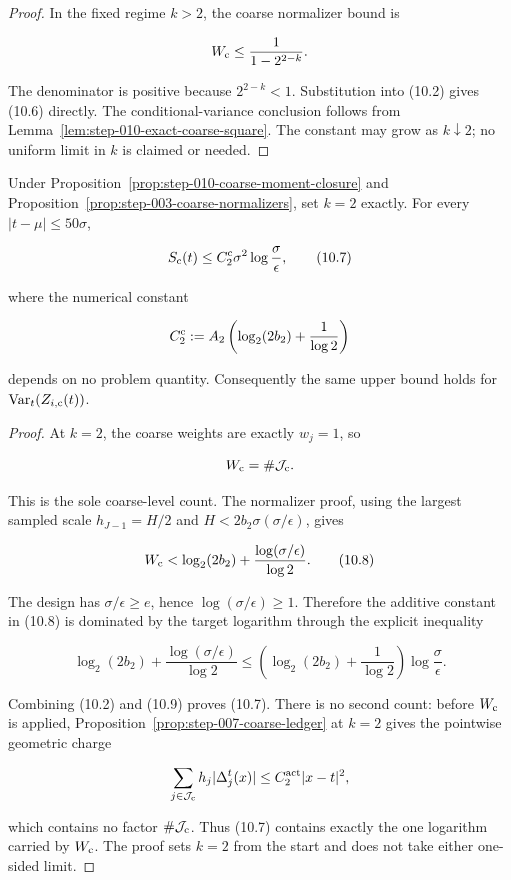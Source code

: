 \begin{proof}
In the fixed regime \(k>2\), the coarse
normalizer bound is

\[
W_{\rm c}\leq\frac1{1-2^{2-k}}.
\]

The denominator is positive because \(2^{2-k}<1\). Substitution into (10.2)
gives (10.6) directly. The conditional-variance conclusion follows from
Lemma~\ref{lem:step-010-exact-coarse-square}. The constant may grow as
\(k\downarrow2\); no uniform limit in \(k\) is claimed or needed.
\end{proof}

\begin{lemma}\label{lem:step-010-critical}
Under Proposition~\ref{prop:step-010-coarse-moment-closure} and Proposition~\ref{prop:step-003-coarse-normalizers}, set \(k=2\) exactly.
For every \(|t-\mu|\leq50\sigma\),

\[
S_{\rm c}(t)
\leq C_2^{\rm c}\sigma^2\log\frac{\sigma}{\epsilon},
\tag{10.7}
\]

where the numerical constant

\[
C_2^{\rm c}
:=A_2\left(\log_2(2b_2)+\frac1{\log2}\right)
\]

depends on no problem quantity. Consequently the same upper bound holds for
\(\operatorname{Var}_t(Z_{i,{\rm c}}(t))\).
\end{lemma}

\begin{proof}
At \(k=2\), the coarse weights are exactly
\(w_j=1\), so

\[
W_{\rm c}=\#\mathcal J_{\rm c}.
\]

This is the sole coarse-level count. The normalizer proof, using the
largest sampled scale \(h_{J-1}=H/2\) and
\(H<2b_2\sigma(\sigma/\epsilon)\), gives

\[
W_{\rm c}
<\log_2(2b_2)+\frac{\log(\sigma/\epsilon)}{\log2}.
\tag{10.8}
\]

The design has \(\sigma/\epsilon\geq e\), hence
\(\log(\sigma/\epsilon)\geq1\). Therefore the additive constant in (10.8)
is dominated by the target logarithm through the explicit inequality

\[
\log_2(2b_2)+\frac{\log(\sigma/\epsilon)}{\log2}
\leq
\left(\log_2(2b_2)+\frac1{\log2}\right)
\log\frac{\sigma}{\epsilon}.
\tag{10.9}
\]

Combining (10.2) and (10.9) proves (10.7). There is no second count:
before \(W_{\rm c}\) is applied, Proposition~\ref{prop:step-007-coarse-ledger} at \(k=2\) gives the
pointwise geometric charge

\[
\sum_{j\in\mathcal J_{\rm c}}h_j|\Delta_j^t(x)|
\leq C_2^{\rm act}|x-t|^2,
\]

which contains no factor \(\#\mathcal J_{\rm c}\). Thus (10.7) contains
exactly the one logarithm carried by \(W_{\rm c}\). The proof sets \(k=2\)
from the start and does not take either one-sided limit.
\end{proof}

